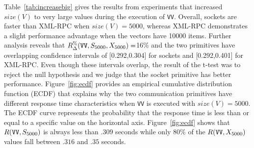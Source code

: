 \documentclass{sig-alternate}
\begin{document}








Table~\ref{tab:increasebig} gives the results from experiments that
increased $size(V)$ to very large values during the execution of
\texttt{VV}.  Overall, sockets are faster than XML-RPC when
$size(V)=5000$, whereas XML-RPC demonstrates a slight performance
advantage when the vectors have 10000 items.  Further analysis reveals
that {\small$R_\Delta^\%(\mbox{{\tt VV}},S_{5000},X_{5000})=$}16\% and
the two primitives have overlapping confidence intervals of
[0.292,0.304] for sockets and [0.292,0.401] for XML-RPC.  Even though
these intervals overlap, the result of the t-test was to reject the
null hypothesis and we judge that the socket primitive has better
performance.  Figure~\ref{fig:ecdf} provides an empirical cumulative
distribution function (ECDF) that explains why the two communication
primitives have different response time characteristics when {\tt VV}
is executed with $size(V)=5000$.  The ECDF curve represents the
probability that the response time is less than or equal to a specific
value on the horizontal axis.  Figure~\ref{fig:ecdf} shows that
$R(\mbox{{\tt VV}}, S_{5000})$ is always less than $.309$ seconds
while only $80\%$ of the $R(\mbox{{\tt VV}}, X_{5000})$ values fall
between $.316$ and $.35$ seconds.
\end{document}
